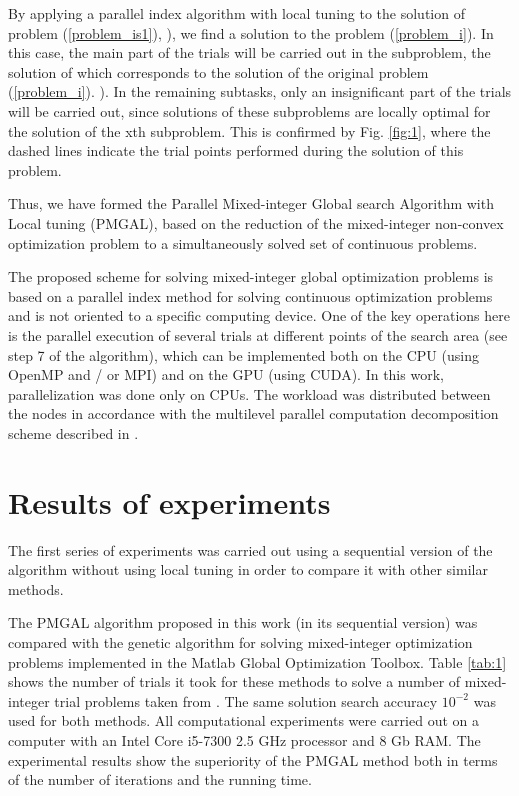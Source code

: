 \documentclass[
11pt,%
tightenlines,%
twoside,%
onecolumn,%
nofloats,%
nobibnotes,%
nofootinbib,%
superscriptaddress,%
noshowpacs,%
centertags]%
{revtex4}
\begin{document}
By applying a parallel index algorithm with local tuning to the solution of problem  (\ref{problem_is1}), ), we find a solution to the problem  (\ref{problem_i}). In this case, the main part of the trials will be carried out in the subproblem, the solution of which corresponds to the solution of the original problem (\ref{problem_i}). ). In the remaining subtasks, only an insignificant part of the trials will be carried out, since solutions of these subproblems are locally optimal for the solution of the xth subproblem. This is confirmed by Fig. \ref{fig:1}, where the dashed lines indicate the trial points performed during the solution of this problem.

Thus, we have formed the Parallel Mixed-integer Global search Algorithm with Local tuning (PMGAL), based on the reduction of the mixed-integer non-convex optimization problem to a simultaneously solved set of continuous problems.

The proposed scheme for solving mixed-integer global optimization problems is based on a parallel index method for solving continuous optimization problems and is not oriented to a specific computing device.  One of the key operations here is the parallel execution of several trials at different points of the search area (see step 7 of the algorithm), which can be implemented both on the CPU (using OpenMP and / or MPI) and on the GPU (using CUDA). 
In this work, parallelization was done only on CPUs. The workload was distributed between the nodes in accordance with the multilevel parallel computation decomposition scheme described in \cite{Strongin2018,Barkalov2020}.

\section{Results of experiments}


The first series of experiments was carried out using a sequential version of the algorithm without using local tuning in order to compare it with other similar methods.

The PMGAL algorithm proposed in this work (in its sequential version) was compared with the genetic algorithm for solving mixed-integer optimization problems implemented in the Matlab Global Optimization Toolbox. Table \ref{tab:1} shows the number of trials it took for these methods to solve a number of mixed-integer trial problems taken from \cite{Deep,Floudas}. The same solution search accuracy $10^{-2}$ was used for both methods. All computational experiments were carried out on a computer with an Intel Core i5-7300 2.5 GHz processor and 8 Gb RAM. The experimental results show the superiority of the PMGAL method both in terms of the number of iterations and the running time.
\end{document}
